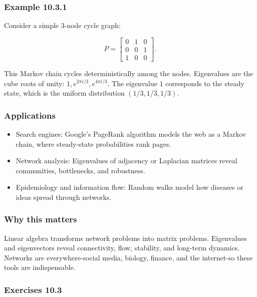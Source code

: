 \documentclass[
  12pt,
  a4paper,
]{article}
\begin{document}
\subsubsection{Example 10.3.1}\label{example-1031}

Consider a simple 3-node cycle graph:

\[P = \begin{bmatrix}
0 & 1 & 0 \\
0 & 0 & 1 \\
1 & 0 & 0
\end{bmatrix}.\]

This Markov chain cycles deterministically among the nodes. Eigenvalues
are the cube roots of unity: \(1, e^{2\pi i/3}, e^{4\pi i/3}\). The
eigenvalue \(1\) corresponds to the steady state, which is the uniform
distribution \((1/3,1/3,1/3)\).

\subsubsection{Applications}\label{applications-3}

\begin{itemize}
\item
  Search engines: Google's PageRank algorithm models the web as a Markov
  chain, where steady-state probabilities rank pages.
\item
  Network analysis: Eigenvalues of adjacency or Laplacian matrices
  reveal communities, bottlenecks, and robustness.
\item
  Epidemiology and information flow: Random walks model how diseases or
  ideas spread through networks.
\end{itemize}

\subsubsection{Why this matters}\label{why-this-matters-38}

Linear algebra transforms network problems into matrix problems.
Eigenvalues and eigenvectors reveal connectivity, flow, stability, and
long-term dynamics. Networks are everywhere-social media, biology,
finance, and the internet-so these tools are indispensable.

\subsubsection{Exercises 10.3}\label{exercises-103}
\end{document}
